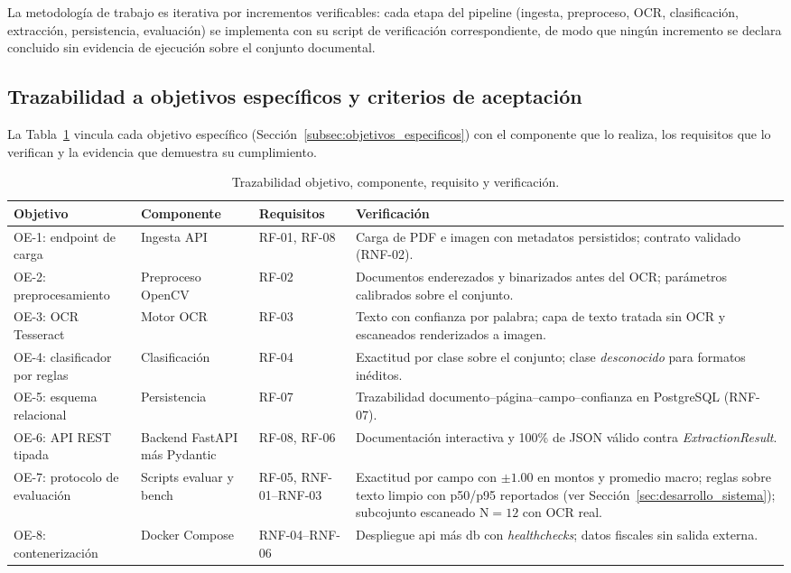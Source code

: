 La metodología de trabajo es iterativa por incrementos verificables: cada etapa del pipeline (ingesta, preproceso, OCR, clasificación, extracción, persistencia, evaluación) se implementa con su script de verificación correspondiente, de modo que ningún incremento se declara concluido sin evidencia de ejecución sobre el conjunto documental\cite{structured_extraction_2023}.

\subsection{Trazabilidad a objetivos específicos y criterios de aceptación} \label{sec:prop_trazabilidad}

La Tabla~\ref{tab:trazabilidad_objetivos} vincula cada objetivo específico (Sección~\ref{subsec:objetivos_especificos}) con el componente que lo realiza, los requisitos que lo verifican y la evidencia que demuestra su cumplimiento.

\begin{table}[H]
\centering
\small
\caption{Trazabilidad objetivo, componente, requisito y verificación.}
\label{tab:trazabilidad_objetivos}
\begin{tabular}{@{}p{1.9cm}p{3.2cm}p{2.2cm}p{5.7cm}@{}}
\toprule
\textbf{Objetivo} & \textbf{Componente} & \textbf{Requisitos} & \textbf{Verificación} \\
\midrule
OE-1: endpoint de carga & Ingesta API & RF-01, RF-08 & Carga de PDF e imagen con metadatos persistidos; contrato validado (RNF-02)\cite{fastapi_docs}. \\
OE-2: preprocesamiento & Preproceso OpenCV & RF-02 & Documentos enderezados y binarizados antes del OCR; parámetros calibrados sobre el conjunto\cite{opencv_docs}. \\
OE-3: OCR Tesseract & Motor OCR & RF-03 & Texto con confianza por palabra; capa de texto tratada sin OCR y escaneados renderizados a imagen\cite{tesseract_ocr}. \\
OE-4: clasificador por reglas & Clasificación & RF-04 & Exactitud por clase sobre el conjunto; clase \textit{desconocido} para formatos inéditos\cite{sokolova_metrics_2009}. \\
OE-5: esquema relacional & Persistencia & RF-07 & Trazabilidad documento--página--campo--confianza en PostgreSQL (RNF-07)\cite{postgres_docs_2024}. \\
OE-6: API REST tipada & Backend FastAPI más Pydantic & RF-08, RF-06 & Documentación interactiva y 100\% de JSON válido contra \textit{ExtractionResult}\cite{pydantic_v2_2024}. \\
OE-7: protocolo de evaluación & Scripts evaluar y bench & RF-05, RNF-01--RNF-03 & Exactitud por campo con $\pm 1.00$ en montos y promedio macro; reglas sobre texto limpio con p50/p95 reportados (ver Secci\'on~\ref{sec:desarrollo_sistema}); subcojunto escaneado N${=}12$ con OCR real\cite{sokolova_metrics_2009, tesseract_ocr}. \\
OE-8: contenerización & Docker Compose & RNF-04--RNF-06 & Despliegue api más db con \textit{healthchecks}; datos fiscales sin salida externa\cite{docker_docs}. \\
\bottomrule
\end{tabular}
\end{table}


